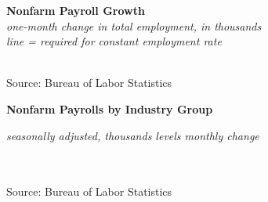 \documentclass{report}
\newcommand{\tbllink}[1]{\href{https://raw.githubusercontent.com/bdecon/US-chartbook/master/chartbook/data/#1}{\faTable}}
\newcommand{\sbar}[4]{
		\addplot[ybar stacked, bar width=2.6pt, draw opacity=0, fill=#1] 
			table [x=#2, y=#3, col sep=comma]{#4};}
\newcommand{\dateaxisticks}{
		date coordinates in=x, axis line style={draw=none},
		xmax={2020-05-10},
		max space between ticks=40,	    
		xtick={{1990-01-01}, {1992-01-01}, {1994-01-01}, 
			{1996-01-01}, {1998-01-01}, {2000-01-01}, 
			{2002-01-01}, {2004-01-01}, {2006-01-01},
			{2008-01-01}, {2010-01-01}, {2012-01-01}, {2014-01-01},
		    {2016-01-01}, {2018-01-01}, {2020-01-01}},
		minor xtick={{1989-01-01}, {1991-01-01}, {1993-01-01},
			{1995-01-01}, {1997-01-01}, {1999-01-01}, 
			{2001-01-01}, {2003-01-01}, {2005-01-01}, {2007-01-01},
		    {2009-01-01}, {2011-01-01}, {2013-01-01}, {2015-01-01},
		    {2017-01-01}, {2019-01-01}},
		enlarge y limits={0.06}, enlarge x limits={0.01},
		}
\newcommand{\bbar}[2]{extra #1 ticks = {{#2}}, extra #1 tick labels = ,
		extra #1 tick style = {grid=major, grid style={thick, black!25}},}
\newcommand{\stdline}[4]{\addplot[very thick, no markers, color=#1] 
		table [x=#2, y=#3, col sep=comma] {#4};	}
\begin{document}
{{{{{{{\begin{minipage}{0.39\textwidth}
\noindent \normalsize \textbf{Nonfarm Payroll Growth}\\
\footnotesize{\textit{one-month change in total employment, in thousands}}\\
\footnotesize{\textit{line = required for constant employment rate}}\\
\noindent \hspace*{-2mm} \\
\footnotesize{Source: Bureau of Labor Statistics} \hfill \tbllink{nfp.csv}
\end{minipage}



\vspace{6mm}

\noindent \normalsize \textbf{Nonfarm Payrolls by Industry Group}\\
\footnotesize{\textit{seasonally adjusted, thousands \hspace{14mm}levels \hspace{17mm} monthly change}\\
\vspace{-5mm}

\hspace*{-3mm} \noindent {} \setlength{\tabcolsep}{3.1pt} \color{black!90}
		{\renewcommand{\arraystretch}{1.55}
		 \begin{tabular}{p{41mm} R{10.5mm} R{10.5mm} R{8.2mm} R{7.8mm} R{7.8mm} 
		   R{7.8mm} R{7.8mm} }
			 \hline
		\end{tabular}
		}	\\
		
\vspace{-2mm}
\footnotesize{Source: Bureau of Labor Statistics} \hspace{7.1cm} \tbllink{ces_data.csv}



\newpage

\begin{minipage}{0.76\textwidth} 


\end{minipage}}}}}}}}}
\end{document}
